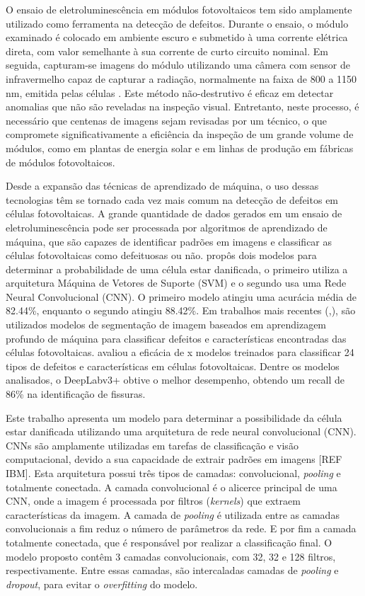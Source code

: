 \documentclass[conference]{IEEEtran}
\begin{document}
O ensaio de eletroluminescência em módulos fotovoltaicos tem sido amplamente
utilizado como ferramenta na detecção de
defeitos. Durante o ensaio, o módulo examinado é colocado em ambiente escuro e
submetido à uma corrente elétrica direta, com valor semelhante à sua corrente
de curto circuito nominal.  Em seguida, capturam-se imagens do módulo
utilizando uma câmera com sensor de infravermelho capaz de capturar a radiação,
normalmente na faixa de 800 a 1150 nm, emitida pelas células
\cite{Frazao20177}. Este método não-destrutivo é eficaz em detectar anomalias
que não são reveladas na inspeção visual. Entretanto, neste processo,
é necessário que centenas de imagens sejam revisadas por um técnico, o que
compromete significativamente a eficiência da inspeção de um grande volume de
módulos, como em plantas de energia solar e em linhas de produção em fábricas
de módulos fotovoltaicos.

Desde a expansão das técnicas de aprendizado de máquina, o uso dessas
tecnologias têm se tornado cada vez mais comum na detecção de defeitos em
células fotovoltaicas. A grande quantidade de dados gerados em um ensaio de
eletroluminescência pode ser processada por algoritmos de aprendizado de
máquina, que são capazes de identificar padrões em imagens e classificar as
células fotovoltaicas como defeituosas ou não. \cite{Pratt2023} propôs
dois modelos
para determinar a probabilidade de uma célula estar danificada, o primeiro
utiliza a arquitetura
Máquina de Vetores de Suporte (SVM) e o segundo usa uma Rede Neural
Convolucional (CNN). O primeiro modelo atingiu uma acurácia média de 82.44\%,
enquanto o segundo atingiu 88.42\%. Em trabalhos mais recentes
(\cite{Pratt2023},\cite{Pratt2021}), são
utilizados modelos de segmentação de imagem baseados em aprendizagem profundo
de máquina para classificar defeitos e características encontradas das células
fotovoltaicas.\cite{Pratt2023} avaliou a eficácia de x modelos treinados para
classificar
24 tipos de defeitos e características em células fotovoltaicas.
Dentre os modelos analisados, o DeepLabv3+ obtive o melhor
desempenho, obtendo um recall de 86\% na identificação de fissuras.

Este trabalho apresenta um modelo para determinar a
possibilidade da célula estar danificada utilizando uma arquitetura de rede
neural convolucional (CNN). CNNs são amplamente utilizadas em tarefas de
classificação e visão computacional, devido a sua capacidade de extrair padrões
em imagens [REF IBM]. Esta arquitetura possui três tipos de camadas:
convolucional, \textit{pooling} e totalmente conectada. A camada convolucional
é o alicerce principal de uma CNN, onde a imagem é processada por filtros
(\textit{kernels}) que
extraem características da imagem. A camada de \textit{pooling} é utilizada
entre as camadas convolucionais a fim reduz o número de parâmetros da rede. E
por fim a camada totalmente conectada, que é responsável por realizar a
classificação final. O modelo proposto contêm 3 camadas convolucionais, com 32,
32 e 128 filtros, respectivamente. Entre essas camadas, são intercaladas
camadas de
\textit{pooling} e \textit{dropout}, para evitar o \textit{overfitting} do
modelo.
\end{document}
